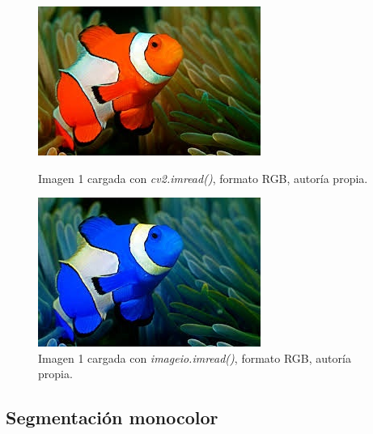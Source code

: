 \documentclass[a4paper,12pt]{article}
\begin{document}
{\begin{figure}[H]
  \centering
  \begin{minipage}[t]{0.35\textwidth}
      \centering
      \includegraphics[width=\textwidth]{processed_data/cv2_charged_0.jpg} 
      \caption{Imagen 1 cargada con \textit{cv2.imread()}, formato RGB, autoría propia.}
      \label{fig:cv2_charged}
  \end{minipage}
  \hfill
  \begin{minipage}[t]{0.35\textwidth}
      \centering
      \includegraphics[width=\textwidth]{processed_data/imageio_charged_0.jpg}
      \caption{Imagen 1 cargada con \textit{imageio.imread()}, formato RGB, autoría propia.}
      \label{fig:imageio_charged}
  \end{minipage}
\end{figure}

\subsection{Segmentación monocolor}

}
\end{document}
